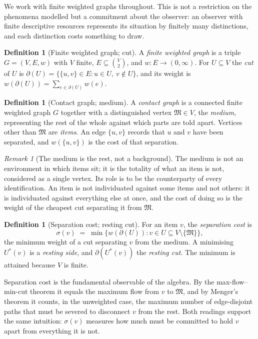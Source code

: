 \documentclass[11pt,a4paper]{article}
\theoremstyle{thmstyle}
\theoremstyle{definition}
\newtheorem{definition}[theorem]{Definition}
\theoremstyle{remark}
\newtheorem{remark}[theorem]{Remark}
\newcommand{\med}{\mathfrak{M}}
\newcommand{\Gph}{G}
\newcommand{\V}{V}
\newcommand{\E}{E}
\newcommand{\wt}{w}
\newcommand{\cut}{\partial}
\newcommand{\sep}{\sigma}
\begin{document}
We work with finite weighted graphs throughout. This is not a restriction on
the phenomena modelled but a commitment about the observer: an observer with
finite descriptive resources represents its situation by finitely many
distinctions, and each distinction costs something to draw.

\begin{definition}[Finite weighted graph; cut]
\label{def:graph}
A \emph{finite weighted graph} is a triple $\Gph=(\V,\E,\wt)$ with $\V$
finite, $\E\subseteq\binom{\V}{2}$, and $\wt\colon\E\to(0,\infty)$. For
$U\subseteq\V$ the \emph{cut} of $U$ is
$\cut(U)=\{\{u,v\}\in\E: u\in U,\ v\notin U\}$, and its weight is
$\wt(\cut(U))=\sum_{e\in\cut(U)}\wt(e)$.
\end{definition}

\begin{definition}[Contact graph; medium]
\label{def:contact}
A \emph{contact graph} is a connected finite weighted graph $\Gph$ together
with a distinguished vertex $\med\in\V$, the \emph{medium}, representing
the rest of the whole against which parts are told apart. Vertices other
than $\med$ are \emph{items}. An edge $\{u,v\}$ records that $u$ and $v$
have been separated, and $\wt(\{u,v\})$ is the cost of that separation.
\end{definition}

\begin{remark}[The medium is the rest, not a background]
\label{rem:medium}
The medium is not an environment in which items sit; it is the totality of
what an item is not, considered as a single vertex. Its role is to be the
counterparty of every identification. An item is not individuated against
some items and not others: it is individuated against everything else at
once, and the cost of doing so is the weight of the cheapest cut separating
it from $\med$.
\end{remark}

\begin{definition}[Separation cost; resting cut]
\label{def:sepcost}
For an item $v$, the \emph{separation cost} is
\[
\sep(v)\;=\;\min\{\wt(\cut(U)) : v\in U\subseteq\V\setminus\{\med\}\},
\]
the minimum weight of a cut separating $v$ from the medium. A minimising
$U^{\ast}(v)$ is a \emph{resting side}, and $\cut(U^{\ast}(v))$ the
\emph{resting cut}. The minimum is attained because $\V$ is finite.
\end{definition}

Separation cost is the fundamental observable of the algebra. By the
max-flow--min-cut theorem \citep{fordfulkerson1956} it equals the maximum
flow from $v$ to $\med$, and by Menger's theorem \citep{menger1927} it
counts, in the unweighted case, the maximum number of edge-disjoint paths
that must be severed to disconnect $v$ from the rest. Both readings support
the same intuition: $\sep(v)$ measures how much must be committed to hold
$v$ apart from everything it is not.
\end{document}
